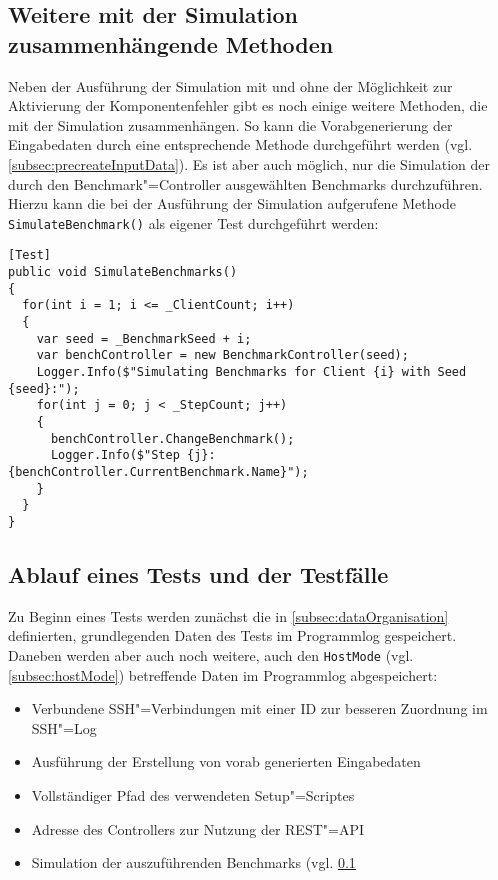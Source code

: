 \subsection{Weitere mit der Simulation zusammenhängende Methoden}
\label{subsec:simulationUtilities}

Neben der Ausführung der Simulation mit und ohne der Möglichkeit zur Aktivierung der Komponentenfehler gibt es noch einige weitere Methoden, die mit der Simulation zusammenhängen.
So kann \zB die Vorabgenerierung der Eingabedaten durch eine entsprechende Methode durchgeführt werden (vgl. \cref{subsec:precreateInputData}).
Es ist aber auch möglich, nur die Simulation der durch den Benchmark"=Controller ausgewählten Benchmarks durchzuführen.
Hierzu kann die bei der Ausführung der Simulation aufgerufene Methode \texttt{SimulateBenchmark()} als eigener Test durchgeführt werden:

\begin{lstlisting}[label=lst:hadoopSimulationBenchmarks,style=cs,
caption={Simulation der auszuführenden Benchmarks}]
[Test]
public void SimulateBenchmarks()
{
  for(int i = 1; i <= _ClientCount; i++)
  {
    var seed = _BenchmarkSeed + i;
    var benchController = new BenchmarkController(seed);
    Logger.Info($"Simulating Benchmarks for Client {i} with Seed {seed}:");
    for(int j = 0; j < _StepCount; j++)
    {
      benchController.ChangeBenchmark();
      Logger.Info($"Step {j}: {benchController.CurrentBenchmark.Name}");
    }
  }
}
\end{lstlisting}

\subsection{Ablauf eines Tests und der Testfälle}
\label{subsec:simulationStep}

Zu Beginn eines Tests werden zunächst die in \cref{subsec:dataOrganisation} definierten, grundlegenden Daten des Tests im Programmlog gespeichert.
Daneben werden aber auch noch weitere, auch den \texttt{HostMode} (vgl. \cref{subsec:hostMode}) betreffende Daten im Programmlog abgespeichert:

\begin{itemize}
    \item Verbundene SSH"=Verbindungen mit einer ID zur besseren Zuordnung im SSH"=Log
    \item Ausführung der Erstellung von vorab generierten Eingabedaten
    \item Vollständiger Pfad des verwendeten Setup"=Scriptes
    \item Adresse des Controllers zur Nutzung der REST"=API
    \item Simulation der auszuführenden Benchmarks (vgl. \cref{subsec:simulationUtilities}
\end{itemize}

